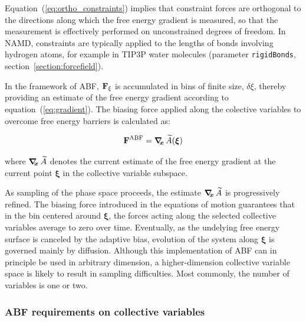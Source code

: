 Equation~(\ref{eq:ortho_constraints}) implies that constraint forces
are orthogonal to the directions along which the free energy gradient is
measured, so that the measurement is effectively performed on unconstrained
degrees of freedom. In NAMD, constraints are typically applied to the lengths of
bonds involving hydrogen atoms, for example in TIP3P water molecules
(parameter \texttt{rigidBonds}, section~\ref{section:forcefield}).


In the framework of ABF,
${\bf F}_\xi$ is accumulated in bins of finite size, $\delta \xi$,
thereby providing an estimate of the free energy gradient
according to equation~({\ref{eq:gradient}}).
The biasing force applied along the colective variables
to overcome free energy barriers is calculated as:

\begin{equation}
  \label{eq:abf}
  {\bf F}^{\rm ABF} = \mbox{\boldmath$\nabla_{\!\!x}\,$} \widetilde A({\mbox{\boldmath{$\xi$}}})
\end{equation}

where $\mbox{\boldmath$\nabla_{\!\!x}\,$} \widetilde A$ denotes the current estimate of the
free energy gradient at the current point $\bm{\xi}$ in the collective
variable subspace.

As sampling of the phase space proceeds, the estimate
$\mbox{\boldmath$\nabla_{\!\!x}\,$} \widetilde A$ is progressively refined. The biasing
force introduced in the equations of motion guarantees that in
the bin centered around $\bm{\xi}$,
the forces acting along the selected collective variables average
to zero over time. Eventually, as the undelying free energy surface is canceled
by the adaptive bias, evolution of the system along $\bm{\xi}$
is governed mainly by diffusion.
Although this implementation of ABF can in principle be used in 
arbitrary dimension, a higher-dimension collective variable space is likely
to result in sampling difficulties.
Most commonly, the number of variables is one or two.


\subsubsection{ABF requirements on collective variables}
\label{sec:colvarbias_abf_req}

